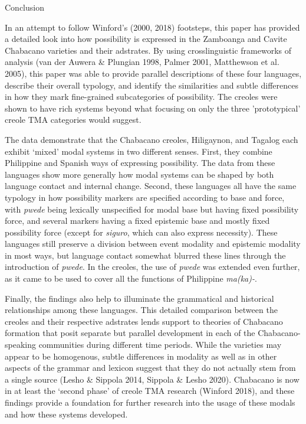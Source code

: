 \begin{listWWNumiiileveli}
\item 
\begin{stylelsSectioni}
Conclusion
\end{stylelsSectioni}
\end{listWWNumiiileveli}
\begin{styleStandard}
In an attempt to follow Winford's (2000, 2018) footsteps, this paper has provided a detailed look into how possibility is expressed in the Zamboanga and Cavite Chabacano varieties and their adstrates. By using crosslinguistic frameworks of analysis (van der Auwera \& Plungian 1998, Palmer 2001, Matthewson et al. 2005), this paper was able to provide parallel descriptions of these four languages, describe their overall typology, and identify the similarities and subtle differences in how they mark fine-grained subcategories of possibility. The creoles were shown to have rich systems beyond what focusing on only the three 'prototypical' creole TMA categories would suggest. 
\end{styleStandard}

\begin{styleStandard}
The data demonstrate that the Chabacano creoles, Hiligaynon, and Tagalog each exhibit ‘mixed’ modal systems in two different senses. First, they combine Philippine and Spanish ways of expressing possibility. The data from these languages show more generally how modal systems can be shaped by both language contact and internal change. Second, these languages all have the same typology in how possibility markers are specified according to base and force, with \textit{pwede} being lexically unspecified for modal base but having fixed possibility force, and several markers having a fixed epistemic base and mostly fixed possibility force (except for \textit{siguro}, which can also express necessity). These languages still preserve a division between event modality and epistemic modality in most ways, but language contact somewhat blurred these lines through the introduction of \textit{pwede}. In the creoles, the use of \textit{pwede} was extended even further, as it came to be used to cover all the functions of Philippine \textit{ma(ka)-}.
\end{styleStandard}

\begin{styleStandard}
Finally, the findings also help to illuminate the grammatical and historical relationships among these languages. This detailed comparison between the creoles and their respective adstrates lends support to theories of Chabacano formation that posit separate but parallel development in each of the Chabacano-speaking communities during different time periods. While the varieties may appear to be homogenous, subtle differences in modality as well as in other aspects of the grammar and lexicon suggest that they do not actually stem from a single source (Lesho \& Sippola 2014, Sippola \& Lesho 2020). Chabacano is now in at least the ‘second phase’ of creole TMA research (Winford 2018), and these findings provide a foundation for further research into the usage of these modals and how these systems developed.
\end{styleStandard}

